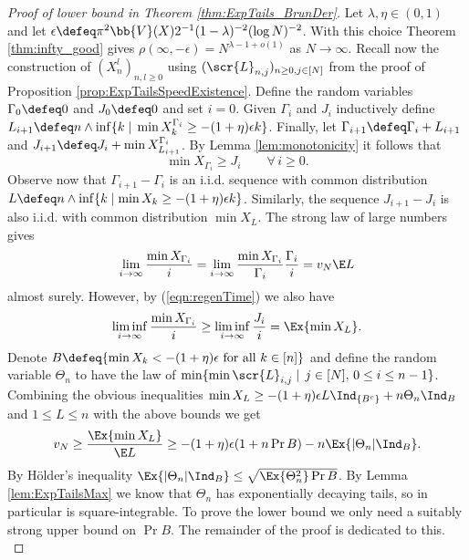 \begin{proof}[Proof of lower bound in Theorem \ref{thm:ExpTails_BrunDer}]

Let $\lambda, \eta \in (0,1)$ and let $\epsilon \defeq \pi^2 \bb{V}(X) 2^{-1} (1-\lambda)^{-2}(\log N)^{-2}$. With this choice Theorem \ref{thm:infty_good} gives $\rho(\infty, - \epsilon) = N^{\lambda - 1 + o(1)}$ as $N \to \infty$. Recall now the construction of $(X^l_n)_{n, l \geq 0}$ using $(\scr{L}_{n, j})_{n \geq 0, j \in [N]}$ from the proof of Proposition \ref{prop:ExpTailsSpeedExistence}. Define the random variables $\Gamma_0 \defeq 0$ and $J_0 \defeq 0$ and set $i = 0$. Given $\Gamma_i$ and $J_i$ inductively define $L_{i+1} \defeq n \land \inf\{ k \mid\, \min X^{\Gamma_i}_k \geq -(1+\eta)\epsilon k\}$. Finally, let $\Gamma_{i+1} \defeq \Gamma_i + L_{i+1}$ and $J_{i+1} \defeq J_i + \min X^{\Gamma_i}_{L_{i+1}}$. By Lemma \ref{lem:monotonicity} it follows that 
\begin{equation}\label{eqn:regenTime}
\min X_{\Gamma_i} \geq J_i \qquad\forall\, i \geq 0. 
\end{equation}
Observe now that $\Gamma_{i+1} - \Gamma_i$ is an i.i.d. sequence with common distribution $L \defeq n \land \inf \{ k \mid \min X_k \geq - (1+\eta)\epsilon k\}$. Similarly, the sequence $J_{i+1} - J_i$ is also i.i.d. with common distribution $\min X_L$. The strong law of large numbers gives 
\begin{equation}
\lim\limits_{i \to \infty} \frac{\min X_{\Gamma_i}}{i} = \lim\limits_{i \to \infty} \frac{\min X_{\Gamma_i}}{\Gamma_i} \frac{\Gamma_i}{i} = v_N \E L
\end{equation}
almost surely. However, by (\ref{eqn:regenTime}) we also have
\begin{equation}
\liminf\limits_{i \to \infty} \frac{\min X_{\Gamma_i}}{i} \geq \liminf\limits_{i \to \infty} \frac{J_i}{i} = \Ex{\min X_L}.
\end{equation}
Denote $B \defeq \{ \min X_k < - (1+\eta)\epsilon \text{ for all } k \in [n]\}$ and define the random variable $\Theta_n$ to have the law of $\min \{\min \scr{L}_{i, j} \mid\, j \in [N],\, 0 \leq i \leq n - 1 \}$. Combining the obvious inequalities $\min X_L \geq -(1 + \eta)\epsilon L \Ind_{\{B^c\}} + n \Theta_n \Ind_B$ and $1 \leq L \leq n$ with the above bounds we get
\begin{equation}\label{eqn:lowerBdd}
v_N \geq \frac{\Ex{\min X_L}}{\E L} \geq -(1+\eta)\epsilon (1 + n\Pr{B}) - n\Ex{|\Theta_n| \Ind_B}. 
\end{equation}
By Hölder's inequality $\Ex{|\Theta_n| \Ind_B} \leq \sqrt{\Ex{\Theta_n^2}\Pr{B}}$. By Lemma \ref{lem:ExpTailsMax} we know that $\Theta_n$ has exponentially decaying tails, so in particular is square-integrable. To prove the lower bound we only need a suitably strong upper bound on $\Pr{B}$. The remainder of the proof is dedicated to this. \\


\end{proof}
